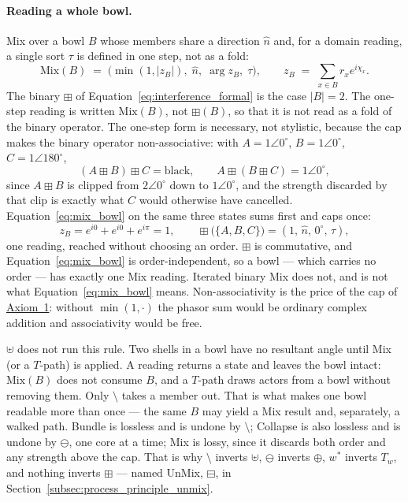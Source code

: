 \documentclass[12pt, a4paper]{article}
\begin{document}
\paragraph{Reading a whole bowl.}
Mix over a bowl $B$ whose members share a direction $\hat n$ and, for
a domain reading, a single sort $\tau$ is
defined in one step, not as a fold:
\begin{equation}
    \mathrm{Mix}(B) \;=\; \bigl(\min(1,|z_B|),\;\hat n,\;\arg z_B,\;\tau\bigr),
    \qquad
    z_B \;=\; \sum_{x\in B} r_x e^{i\chi_x}.
    \label{eq:mix_bowl}
\end{equation}
The binary $\boxplus$ of Equation~\eqref{eq:interference_formal} is the case $|B|=2$. The one-step reading is written $\mathrm{Mix}(B)$, not $\boxplus(B)$, so that it is not read as a fold of the binary operator. The one-step form is necessary, not stylistic,
because the cap makes the binary operator non-associative: with
$A=1\angle 0^\circ$, $B=1\angle 0^\circ$, $C=1\angle 180^\circ$,
\[
(A\boxplus B)\boxplus C=\text{black},
\qquad
A\boxplus(B\boxplus C)=1\angle 0^\circ ,
\]
since $A\boxplus B$ is clipped from $2\angle 0^\circ$ down to
$1\angle 0^\circ$, and the strength discarded by that clip is exactly
what $C$ would otherwise have cancelled.
Equation~\eqref{eq:mix_bowl} on the same three states sums first and
caps once:
\[
z_B = e^{i0}+e^{i0}+e^{i\pi} = 1,
\qquad
\boxplus\bigl(\{A,B,C\}\bigr) = (1,\,\hat n,\,0^\circ,\,\tau),
\]
one reading, reached without choosing an order. $\boxplus$ is
commutative,
and Equation~\eqref{eq:mix_bowl} is order-independent, so a bowl ---
which carries no order --- has exactly one Mix reading. Iterated
binary Mix does not, and is not what
Equation~\eqref{eq:mix_bowl} means. Non-associativity is the price of
the cap of \hyperref[subsec:axiom1]{Axiom~1}: without $\min(1,\cdot)$ the
phasor sum would be ordinary complex addition and associativity would
be free.

$\uplus$ does not run this rule. Two shells in a bowl have no
resultant angle until Mix (or a $T$-path) is applied.
A reading returns a state and leaves the bowl intact: $\mathrm{Mix}(B)$ does not consume $B$, and a $T$-path draws actors from a bowl without
removing them. Only $\setminus$ takes a member out. That is what makes
one bowl readable more than once --- the same $B$ may yield a Mix
result and, separately, a walked path.
Bundle is lossless and is undone by $\setminus$; Collapse is also
lossless and is undone by $\ominus$, one core at a time; Mix
is lossy, since it discards both order and any strength above the
cap. That is why $\setminus$ inverts $\uplus$, $\ominus$ inverts
$\oplus$, $w^{*}$ inverts $T_w$, and nothing inverts $\boxplus$ ---
named UnMix, $\boxminus$, in
Section~\ref{subsec:process_principle_unmix}.
\end{document}
